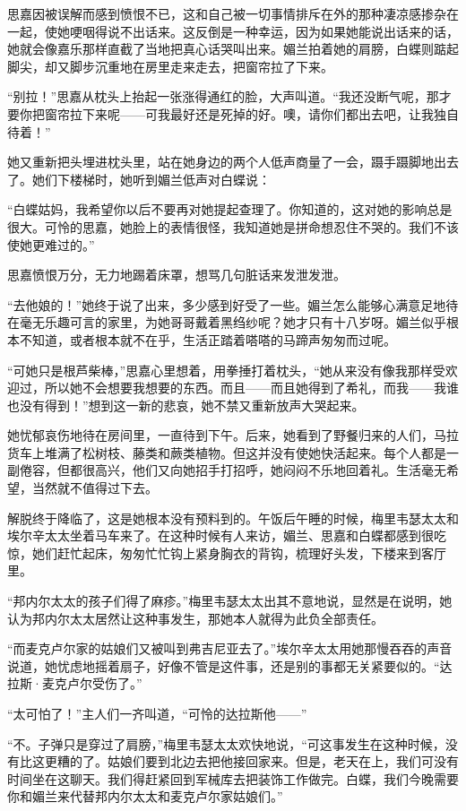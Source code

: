 \par 思嘉因被误解而感到愤恨不已，这和自己被一切事情排斥在外的那种凄凉感掺杂在一起，使她哽咽得说不出话来。这反倒是一种幸运，因为如果她能说出话来的话，她就会像嘉乐那样直截了当地把真心话哭叫出来。媚兰拍着她的肩膀，白蝶则踮起脚尖，却又脚步沉重地在房里走来走去，把窗帘拉了下来。
\par “别拉！”思嘉从枕头上抬起一张涨得通红的脸，大声叫道。“我还没断气呢，那才要你把窗帘拉下来呢——可我最好还是死掉的好。噢，请你们都出去吧，让我独自待着！”
\par 她又重新把头埋进枕头里，站在她身边的两个人低声商量了一会，蹑手蹑脚地出去了。她们下楼梯时，她听到媚兰低声对白蝶说：
\par “白蝶姑妈，我希望你以后不要再对她提起查理了。你知道的，这对她的影响总是很大。可怜的思嘉，她脸上的表情很怪，我知道她是拼命想忍住不哭的。我们不该使她更难过的。”
\par 思嘉愤恨万分，无力地踢着床罩，想骂几句脏话来发泄发泄。
\par “去他娘的！”她终于说了出来，多少感到好受了一些。媚兰怎么能够心满意足地待在毫无乐趣可言的家里，为她哥哥戴着黑绉纱呢？她才只有十八岁呀。媚兰似乎根本不知道，或者根本就不在乎，生活正踏着嗒嗒的马蹄声匆匆而过呢。
\par “可她只是根芦柴棒，”思嘉心里想着，用拳捶打着枕头，“她从来没有像我那样受欢迎过，所以她不会想要我想要的东西。而且——而且她得到了希礼，而我——我谁也没有得到！”想到这一新的悲哀，她不禁又重新放声大哭起来。
\par 她忧郁哀伤地待在房间里，一直待到下午。后来，她看到了野餐归来的人们，马拉货车上堆满了松树枝、藤类和蕨类植物。但这并没有使她快活起来。每个人都是一副倦容，但都很高兴，他们又向她招手打招呼，她闷闷不乐地回着礼。生活毫无希望，当然就不值得过下去。
\par 解脱终于降临了，这是她根本没有预料到的。午饭后午睡的时候，梅里韦瑟太太和埃尔辛太太坐着马车来了。在这种时候有人来访，媚兰、思嘉和白蝶都感到很吃惊，她们赶忙起床，匆匆忙忙钩上紧身胸衣的背钩，梳理好头发，下楼来到客厅里。
\par “邦内尔太太的孩子们得了麻疹。”梅里韦瑟太太出其不意地说，显然是在说明，她认为邦内尔太太居然让这种事发生，那她本人就得为此负全部责任。
\par “而麦克卢尔家的姑娘们又被叫到弗吉尼亚去了。”埃尔辛太太用她那慢吞吞的声音说道，她忧虑地摇着扇子，好像不管是这件事，还是别的事都无关紧要似的。“达拉斯·麦克卢尔受伤了。”
\par “太可怕了！”主人们一齐叫道，“可怜的达拉斯他——”
\par “不。子弹只是穿过了肩膀，”梅里韦瑟太太欢快地说，“可这事发生在这种时候，没有比这更糟的了。姑娘们要到北边去把他接回家来。但是，老天在上，我们可没有时间坐在这聊天。我们得赶紧回到军械库去把装饰工作做完。白蝶，我们今晚需要你和媚兰来代替邦内尔太太和麦克卢尔家姑娘们。”
